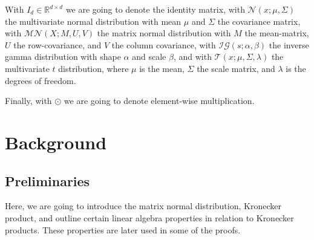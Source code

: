 \documentclass{mldsmsc}
\begin{document}
\noindent With $I_d \in \mathbb{R}^{d \times d}$ we are going to denote the identity matrix, with $\mathcal{N}(x; \mu, \Sigma)$ the multivariate normal distribution with mean $\mu$ and $\Sigma$ the covariance matrix, with $\mathcal{MN}(X; M, U, V)$ the matrix normal distribution with $M$ the mean-matrix, $U$ the row-covariance, and $V$ the column covariance, with  $\mathcal{IG}(s; \alpha, \beta)$ the inverse gamma distribution with shape $\alpha$ and scale $\beta$, and with $\mathcal{T}(x; \mu, \Sigma, \lambda)$ the multivariate $t$ distribution, where $\mu$ is the mean, $\Sigma$ the scale matrix, and $\lambda$ is the degrees of freedom. \newline

\noindent Finally, with $\odot$ we are going to denote element-wise multiplication.




\chapter{Background}

\section{Preliminaries}

Here, we are going to introduce the matrix normal distribution, Kronecker product, and outline certain linear algebra properties in relation to Kronecker products. These properties are later used in some of the proofs.
\end{document}
